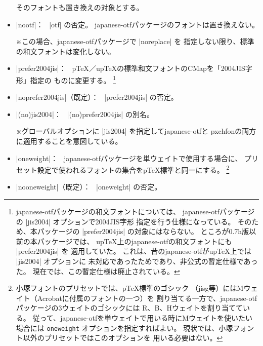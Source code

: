 \documentclass[uplatex,dvipdfmx,a4paper]{jsarticle}
\newcommand{\Pkg}[1]{\textsf{#1}}
\newcommand{\Note}{\par\noindent ※}
\newcommand{\Means}{：\ }
\providecommand{\pTeX}{p\TeX}
\providecommand{\upTeX}{u\pTeX}
\begin{document}
\begin{itemize}
  そのフォントも置き換えの対象とする。
\item |nootf|\Means
  |otf| の否定。
  \Pkg{japanese-otf}パッケージのフォントは置き換えない。
  \Note この場合、\Pkg{japanese-otf}パッケージで |noreplace| を
  指定しない限り、標準の和文フォントは変化しない。
\item |prefer2004jis|\Means
  {\pTeX}／{\upTeX}の標準和文フォントのCMapを「2004JIS字形」指定の
  ものに変更する。
  \footnote{\Pkg{japanese-otf}パッケージの和文フォントについては、
    \Pkg{japanese-otf}パッケージの |jis2004| オプションで2004JIS字形
    指定を行う仕様になっている。
    そのため、本パッケージの |prefer2004jis| の対象にはならない。
    ところが0.7h版以前の本パッケージでは、
    {\upTeX}上の\Pkg{japanese-otf}の和文フォントにも |prefer2004jis| を
    適用していた。
    これは、昔の\Pkg{japanese-otf}が{\upTeX}上では |jis2004| オプションに
    未対応であったためであり、非公式の暫定仕様であった。
    現在では、この暫定仕様は廃止されている。}
\item |noprefer2004jis|（既定）\Means
  |prefer2004jis| の否定。
\item |(no)jis2004|\Means
  |(no)prefer2004jis| の別名。
  \Note グローバルオプションに |jis2004| を指定して\Pkg{japanese-otf}と
  \Pkg{pxchfon}の両方に適用することを意図している。
\item |oneweight|\Means
  \Pkg{japanese-otf}パッケージを単ウェイトで使用する場合に、
  プリセット設定で使われるフォントの集合を{\pTeX}標準と同一にする。
  \footnote{小塚フォントのプリセットでは、{\pTeX}標準のゴシック
  （jisg等）にはMウェイト（Acrobatに付属のフォントの一つ）を
  割り当てる一方で、\Pkg{japanese-otf}パッケージの3ウェイトのゴシックには
  R、B、Hウェイトを割り当てている。
  従って、\Pkg{japanese-otf}を単ウェイトで用いる時にMウェイトを使いたい
  場合には \texttt{oneweight} オプションを指定すればよい。
  現状では、小塚フォント以外のプリセットではこのオプションを
  用いる必要はない。}
\item |nooneweight|（既定）\Means
  |oneweight| の否定。
\end{itemize}
\end{document}
